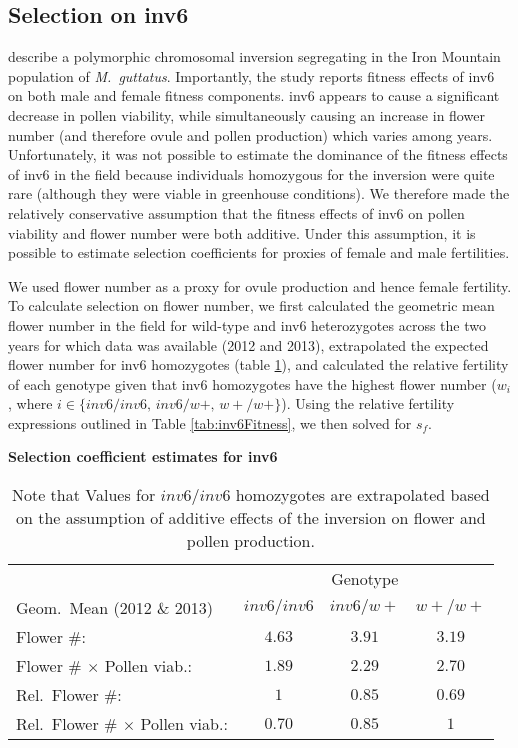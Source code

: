 \documentclass[11pt]{article}
\begin{document}
\subsection*{Selection on inv6}

\citet{LeeKelly2015} describe a polymorphic chromosomal inversion segregating in the Iron Mountain population of {\itshape M.~guttatus}. Importantly, the study reports fitness effects of inv6 on both male and female fitness components. inv6 appears to cause a significant decrease in pollen viability, while simultaneously causing an increase in flower number (and therefore ovule and pollen production) which varies among years. Unfortunately, it was not possible to estimate the dominance of the fitness effects of inv6 in the field because individuals homozygous for the inversion were quite rare (although they were viable in greenhouse conditions). We therefore made the relatively conservative assumption that the fitness effects of inv6 on pollen viability and flower number were both additive. Under this assumption, it is possible to estimate selection coefficients for proxies of female and male fertilities. 

We used flower number as a proxy for ovule production and hence female fertility. To calculate selection on flower number, we first calculated the geometric mean flower number in the field for wild-type and inv6 heterozygotes across the two years for which data was available (2012 and 2013), extrapolated the expected flower number for inv6 homozygotes (table \ref{tab:MimReproEst}), and calculated the relative fertility of each genotype given that inv6 homozygotes have the highest flower number ($w_i$, where $i \in \{inv6/inv6,\, inv6/w+,\, w+/w+\}$). Using the relative fertility expressions outlined in Table \ref{tab:inv6Fitness}, we then solved for $s_f$. 

\begin{table}[htbp]
 \centering
 \caption{\bf Selection coefficient estimates for inv6}
\label{tab:MimReproEst}
\begin{tabular}{lccc}
 \toprule
 	&  \multicolumn{3}{c}{{Genotype}} \\ 
\cline{2-4}
Geom.~Mean (2012 \& 2013)			& $inv6/inv6$	& $inv6/w+$		& $w+/w+$ \\ \hline
Flower \#:								& $4.63$	& $3.91$	& $3.19$ \\	
Flower \# $\times$ Pollen viab.:		& $1.89$	& $2.29$	& $2.70$ \\ \hline
Rel.~Flower \#:							& $1$		& $0.85$	& $0.69$ \\	
Rel.~Flower \# $\times$ Pollen viab.:	& $0.70$	& $0.85$	& $1$ \\	
\hline
\end{tabular}
\caption{\footnotesize{Note that Values for $inv6/inv6$ homozygotes are extrapolated based on the assumption of additive effects of the inversion on flower and pollen production.}}
\end{table}
\end{document}
